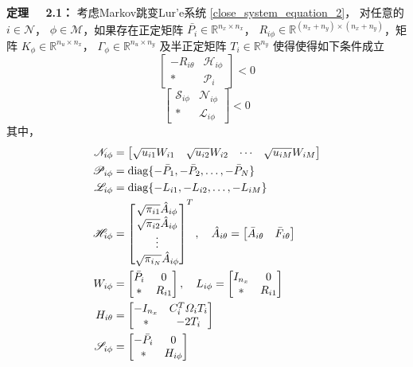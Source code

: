	{\bf 定理 \ \ 2.1：}
	考虑Markov跳变Lur'e系统 \eqref{close_system_equation_2}， 对任意的 $i \in \mathcal{N}$， $\phi \in \mathcal{M}$，如果存在正定矩阵 $\bar{P_i} \in \mathbb{R}^{n_x\times n_x}$， $R_{i\phi } \in \mathbb{R}^{(n_x+n_y)\times(n_x+n_y)}$，矩阵 $K_{\phi} \in \mathbb{R}^{n_u\times n_x}$， $\varGamma_{\phi} \in \mathbb{R}^{n_u \times n_y}$ 及半正定矩阵 $T_{i}\in \mathbb{R}^{n_y}$ 使得使得如下条件成立
	\begin{equation}\label{condition_1_1}
	\begin{bmatrix}
	-R_{i\theta}&\mathscr{H}_{i\phi}\\
	*&\mathscr{P}_{i}
	\end{bmatrix}<0
	\end{equation}
	\begin{equation}\label{condition_1_2}
	\begin{bmatrix}
	\mathscr{S}_{i\phi}&\mathscr{N}_{i\phi}\\
	*&\mathscr{L}_{i\phi}
	\end{bmatrix}<0
	\end{equation}
	其中，
	\begin{equation}\notag
	\begin{aligned}
	\mathscr{N}_{i\phi}&=\begin{bmatrix}
	\sqrt{u_{i1}}W_{i1}&\sqrt{u_{i2}}W_{i2}&\cdots&\sqrt{u_{iM}}W_{iM}
	\end{bmatrix}\\
	\mathscr{P}_{i\phi}&=\mathrm{diag} \{-\bar{P}_{1},-\bar{P}_{2},\dots,-\bar{P}_{N}  \}\\
	\mathscr{L}_{i\phi}&=\mathrm{diag} \{-L_{i1},-L_{i2},\dots,-L_{iM}  \}\\
	\mathscr{H}_{i\phi}&=\begin{bmatrix}
	\sqrt{\pi_{i1}}\hat{A}_{i\phi}\\
	\sqrt{\pi_{i2}}\hat{A}_{i\phi}\\
	\vdots\\
	\sqrt{\pi_{i_N}}\hat{A}_{i\phi}
	\end{bmatrix}^{T}, \quad
	\hat{A}_{i\theta}=\begin{bmatrix}
	\bar{A}_{i\theta}&\bar{F}_{i\theta}
	\end{bmatrix}  \\
	W_{i\phi}&=\begin{bmatrix}
	\bar{P}_{i}&0\\
	*&R_{i1}
	\end{bmatrix}, \quad
	L_{i\phi}=\begin{bmatrix}
	I_{n_x}&0\\
	*&R_{i1}
	\end{bmatrix}\\
	H_{i\theta}&=\begin{bmatrix}
	-I_{n_x}&C^{T}_{i}\varOmega_{i}T_{i} \\
	*&-2T_{i}
	\end{bmatrix}\\
	\mathscr{S}_{i\phi}&= \begin{bmatrix}
	-\bar{P}_{i}&0\\
	*&H_{i\phi}
	\end{bmatrix}\\
	\end{aligned}
	\end{equation}
